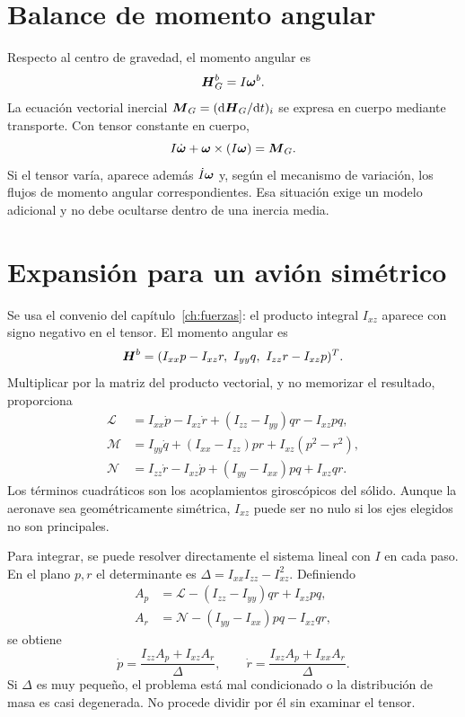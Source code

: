 \section{Balance de momento angular}
Respecto al centro de gravedad, el momento angular es
\begin{equation}
\boldsymbol{H}_G^b=I\boldsymbol{\omega}^b.
\end{equation}
La ecuación vectorial inercial $\boldsymbol{M}_G=(\mathrm{d}\boldsymbol{H}_G/\mathrm{d} t)_i$ se expresa en cuerpo mediante transporte. Con tensor constante en cuerpo,
\begin{equation}
I\dot{\boldsymbol{\omega}}+\boldsymbol{\omega}\times(I\boldsymbol{\omega})=\boldsymbol{M}_G.
\label{eq:euler-vector}
\end{equation}
Si el tensor varía, aparece además $\dot I\boldsymbol{\omega}$ y, según el mecanismo de variación, los flujos de momento angular correspondientes. Esa situación exige un modelo adicional y no debe ocultarse dentro de una inercia media.

\section{Expansión para un avión simétrico}
Se usa el convenio del capítulo~\ref{ch:fuerzas}: el producto integral $I_{xz}$ aparece con signo negativo en el tensor. El momento angular es
\begin{equation}
\vect H^b=(I_{xx}p-I_{xz}r,\ I_{yy}q,\ I_{zz}r-I_{xz}p)^T.
\end{equation}
Multiplicar por la matriz del producto vectorial, y no memorizar el resultado, proporciona
\begin{align}
\mathcal L&=I_{xx}\dot p-I_{xz}\dot r+(I_{zz}-I_{yy})qr-I_{xz}pq,\\
\mathcal M&=I_{yy}\dot q+(I_{xx}-I_{zz})pr+I_{xz}(p^2-r^2),\\
\mathcal N&=I_{zz}\dot r-I_{xz}\dot p+(I_{yy}-I_{xx})pq+I_{xz}qr.
\label{eq:euler-componentes}
\end{align}
Los términos cuadráticos son los acoplamientos giroscópicos del sólido. Aunque la aeronave sea geométricamente simétrica, $I_{xz}$ puede ser no nulo si los ejes elegidos no son principales.

Para integrar, se puede resolver directamente el sistema lineal con $I$ en cada paso. En el plano $p,r$ el determinante es $\Delta=I_{xx}I_{zz}-I_{xz}^2$. Definiendo
\begin{align}
A_p&=\mathcal L-(I_{zz}-I_{yy})qr+I_{xz}pq,\\
A_r&=\mathcal N-(I_{yy}-I_{xx})pq-I_{xz}qr,
\end{align}
se obtiene
\begin{equation}
\dot p=\frac{I_{zz}A_p+I_{xz}A_r}{\Delta},\qquad
\dot r=\frac{I_{xz}A_p+I_{xx}A_r}{\Delta}.
\end{equation}
Si $\Delta$ es muy pequeño, el problema está mal condicionado o la distribución de masa es casi degenerada. No procede dividir por él sin examinar el tensor.

